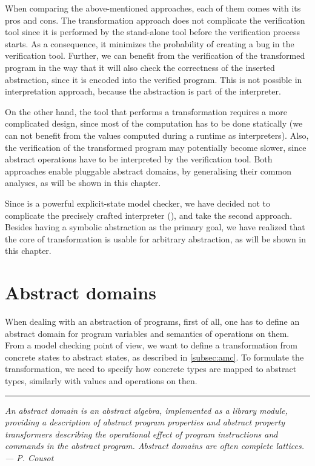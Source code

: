 When comparing the above-mentioned approaches, each of them comes with its pros
and cons. The transformation approach does not complicate the verification tool
since it is performed by the stand-alone tool before the verification process
starts. As a consequence, it minimizes the probability of creating a bug in the
verification tool. Further, we can benefit from the verification of the
transformed program in the way that it will also check the correctness of the
inserted abstraction, since it is encoded into the verified program. This is not possible
in interpretation approach, because the abstraction is part of the interpreter.

On the other hand, the tool that performs a transformation requires a more
complicated design, since most of the computation has to be done statically (we
can not benefit from the values computed during a runtime as interpreters). Also, the verification of the transformed program may potentially become slower, since
abstract operations have to be interpreted by the verification tool.  Both
approaches enable pluggable abstract domains, by generalising their common
analyses, as will be shown in this chapter.

Since \DIVINE is a powerful explicit-state model checker, we have decided not to
complicate the precisely crafted interpreter (\DIVM), and take the second
approach. Besides having a symbolic abstraction as the primary goal, we have
realized that the core of transformation is usable for arbitrary abstraction, as
will be shown in this chapter.

\section{Abstract domains} \label{sec:absdom}

When dealing with an abstraction of programs, first of all, one has to define an
abstract domain for program variables and semantics of operations on them. From
a model checking point of view, we want to define a transformation from
concrete states to abstract states, as described in \autoref{subsec:amc}. To
formulate the transformation, we need to specify how concrete types are mapped to
abstract types, similarly with values and operations on then.

\newpage

\hrule

\bigskip
\noindent
\textit{An abstract domain is an abstract algebra, implemented as a library module,
providing a description of abstract program properties and abstract property
transformers describing the operational effect of program instructions and
commands in the abstract program. Abstract domains are often complete lattices.
--- P. Cousot \cite{Cousot79} }
\bigskip

